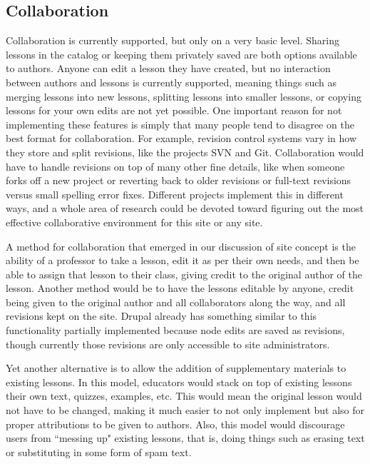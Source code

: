 \documentclass{acm_proc_article-sp}
\begin{document}
\subsection{Collaboration}
Collaboration is currently supported, but only on a very basic level. Sharing lessons in the catalog or keeping them privately saved are both options available to authors. Anyone can edit a lesson they have created, but no interaction between authors and lessons is currently supported, meaning things such as merging lessons into new lessons, splitting lessons into smaller lessons, or copying lessons for your own edits are not yet possible. One important reason for not implementing these features is simply that many people tend to disagree on the best format for collaboration. For example, revision control systems vary in how they store and split revisions, like the projects SVN and Git. Collaboration would have to handle revisions on top of many other fine details, like when someone forks off a new project or reverting back to older revisions or full-text revisions versus small spelling error fixes. Different projects implement this in different ways, and a whole area of research could be devoted toward figuring out the most effective collaborative environment for this site or any site.

A method for collaboration that emerged in our discussion of site concept is the ability of a professor to take a lesson, edit it as per their own needs, and then be able to assign that lesson to their class, giving credit to the original author of the lesson. Another method would be to have the lessons editable by anyone, credit being given to the original author and all collaborators along the way, and all revisions kept on the site. Drupal already has something similar to this functionality partially implemented because node edits are saved as revisions, though currently those revisions are only accessible to site administrators.

Yet another alternative is to allow the addition of supplementary materials to existing lessons. In this model, educators would stack on top of existing lessons their own text, quizzes, examples, etc. This would mean the original lesson would not have to be changed, making it much easier to not only implement but also for proper attributions to be given to authors. Also, this model would discourage users from ``messing up" existing lessons, that is, doing things such as erasing text or substituting in some form of spam text.
\end{document}
